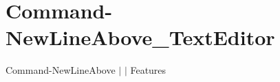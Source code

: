 \chapter{Command-\/\+New\+Line\+Above\+\_\+\+Text\+Editor }
\hypertarget{md__docs_2_text_editor_2_features_2_command-_new_line_above___text_editor}{}\label{md__docs_2_text_editor_2_features_2_command-_new_line_above___text_editor}
Command-\/\+New\+Line\+Above \texorpdfstring{$\vert$}{|}  \texorpdfstring{$\vert$}{|} Features



 